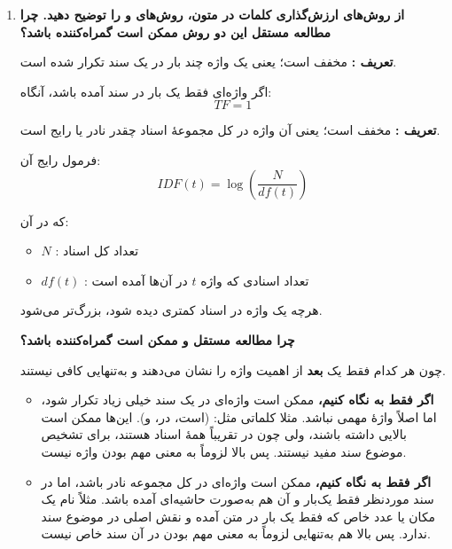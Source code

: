 \documentclass{article}
\begin{document}
\begin{enumerate}
    \item \textbf{از روش‌های ارزش‌گذاری کلمات در متون، روش‌های  و  را توضیح دهید. چرا مطالعه مستقل این دو روش ممکن است گمراه‌کننده باشد؟}

    \vspace{0.5cm}

    \textbf{تعریف :}
     مخفف  است؛ یعنی یک واژه چند بار در یک سند تکرار شده است.

    اگر واژه‌ای فقط یک بار در سند آمده باشد، آنگاه:
    \[
    TF = 1
    \]

    \vspace{0.3cm}

    \textbf{تعریف :}
     مخفف  است؛ یعنی آن واژه در کل مجموعهٔ اسناد چقدر نادر یا رایج است. 

    فرمول رایج آن:
    \[
    IDF(t)=\log\left(\frac{N}{df(t)}\right)
    \]

    که در آن:
    \begin{itemize}
        \item $N$ : تعداد کل اسناد
        \item $df(t)$ : تعداد اسنادی که واژه $t$ در آن‌ها آمده است
    \end{itemize}

    هرچه یک واژه در اسناد کمتری دیده شود،  بزرگ‌تر می‌شود.

    \vspace{0.3cm}

    \textbf{چرا مطالعه مستقل  و  ممکن است گمراه‌کننده باشد؟}
    
    چون هر کدام فقط یک \textbf{بعد} از اهمیت واژه را نشان می‌دهند و به‌تنهایی کافی نیستند.

    \begin{itemize}
        \item \textbf{اگر فقط به  نگاه کنیم،} ممکن است واژه‌ای در یک سند خیلی زیاد تکرار شود، اما اصلاً واژهٔ مهمی نباشد. مثلا کلماتی مثل: (است، در، و). این‌ها ممکن است  بالایی داشته باشند، ولی چون در تقریباً همهٔ اسناد هستند، برای تشخیص موضوع سند مفید نیستند. پس  بالا لزوماً به معنی مهم بودن واژه نیست.
        \item \textbf{اگر فقط به  نگاه کنیم،} ممکن است واژه‌ای در کل مجموعه نادر باشد، اما در سند موردنظر فقط یک‌بار و آن هم به‌صورت حاشیه‌ای آمده باشد. مثلاً نام یک مکان یا عدد خاص که فقط یک بار در متن آمده و نقش اصلی در موضوع سند ندارد. پس  بالا هم به‌تنهایی لزوماً به معنی مهم بودن در آن سند خاص نیست.
    \end{itemize}
    

\end{enumerate}
\end{document}
